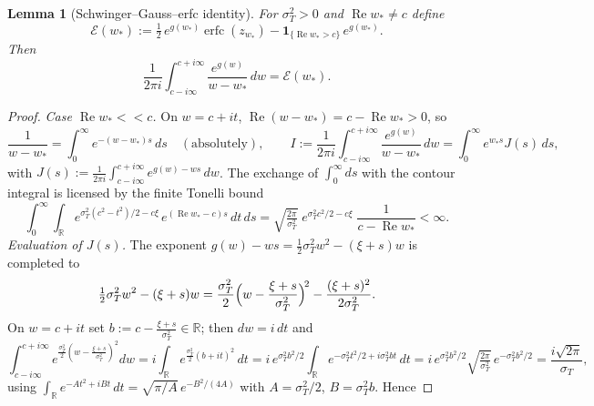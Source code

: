 \documentclass[11pt]{article}
\newtheorem{lemma}[theorem]{Lemma}
\newcommand{\R}{\mathbb{R}}
\DeclareMathOperator{\Real}{Re}
\DeclareMathOperator{\erfc}{erfc}
\begin{document}
\begin{lemma}[Schwinger--Gauss--erfc identity]\label{lem:E}
For $\sigma_T^2>0$ and $\Real w_*\neq c$ define
\begin{equation}\label{eq:Edef}
\boxed{\;\mathcal E(w_*):=\tfrac12\,e^{g(w_*)}\erfc(z_{w_*})
-\mathbf1_{\{\Real w_*>c\}}\,e^{g(w_*)}.\;}
\end{equation}
Then
\begin{equation}\label{eq:E-ident}
\frac{1}{2\pi i}\int_{c-i\infty}^{c+i\infty}\frac{e^{g(w)}}{w-w_*}\,dw
=\mathcal E(w_*).
\end{equation}
\end{lemma}

\begin{proof}
\emph{Case $\Real w_*<<c$.} On $w=c+it$, $\Real(w-w_*)=c-\Real w_*>0$, so
\begin{equation}\label{eq:E-pf1}
\frac{1}{w-w_*}=\int_0^\infty e^{-(w-w_*)s}\,ds\quad(\text{absolutely}),
\qquad
I:=\frac{1}{2\pi i}\int_{c-i\infty}^{c+i\infty}\frac{e^{g(w)}}{w-w_*}\,dw
=\int_0^\infty e^{w_*s}J(s)\,ds,
\end{equation}
with $J(s):=\frac{1}{2\pi i}\int_{c-i\infty}^{c+i\infty}e^{g(w)-ws}\,dw$.
The exchange of $\int_0^\infty ds$ with the contour integral is licensed by
the finite Tonelli bound
\begin{equation}\label{eq:E-tonelli}
\int_0^\infty\!\!\int_\R
e^{\sigma_T^2(c^2-t^2)/2-c\xi}\,e^{(\Real w_*-c)s}\,dt\,ds
=\sqrt{\tfrac{2\pi}{\sigma_T^2}}\;e^{\sigma_T^2 c^2/2-c\xi}\;
\frac{1}{c-\Real w_*}<\infty .
\end{equation}
\emph{Evaluation of $J(s)$.} The exponent
$g(w)-ws=\tfrac12\sigma_T^2w^2-(\xi+s)w$ is completed to
\begin{equation}\label{eq:E-Jcompl}
\tfrac12\sigma_T^2w^2-(\xi+s)w
=\frac{\sigma_T^2}{2}\Bigl(w-\frac{\xi+s}{\sigma_T^2}\Bigr)^{\!2}
-\frac{(\xi+s)^2}{2\sigma_T^2}.
\end{equation}
On $w=c+it$ set $b:=c-\tfrac{\xi+s}{\sigma_T^2}\in\R$; then $dw=i\,dt$ and
\begin{equation}\label{eq:E-Jint}
\int_{c-i\infty}^{c+i\infty}
e^{\frac{\sigma_T^2}{2}(w-\frac{\xi+s}{\sigma_T^2})^2}dw
=i\!\int_\R e^{\frac{\sigma_T^2}{2}(b+it)^2}\,dt
=i\,e^{\sigma_T^2 b^2/2}\!\int_\R e^{-\sigma_T^2t^2/2+i\sigma_T^2 b t}\,dt
=i\,e^{\sigma_T^2 b^2/2}\sqrt{\tfrac{2\pi}{\sigma_T^2}}\,e^{-\sigma_T^2 b^2/2}
=\frac{i\sqrt{2\pi}}{\sigma_T},
\end{equation}
using $\int_\R e^{-At^2+iBt}\,dt=\sqrt{\pi/A}\,e^{-B^2/(4A)}$ with
$A=\sigma_T^2/2$, $B=\sigma_T^2 b$. Hence

\end{proof}
\end{document}
